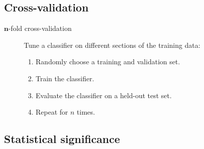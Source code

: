 \subsection{Cross-validation}

\begin{description}
    \item[$\mathbf{n}$-fold cross-validation] 
        Tune a classifier on different sections of the training data:
        \begin{enumerate}
            \item Randomly choose a training and validation set.
            \item Train the classifier.
            \item Evaluate the classifier on a held-out test set.
            \item Repeat for $n$ times.
        \end{enumerate}
\end{description}

\subsection{Statistical significance}

